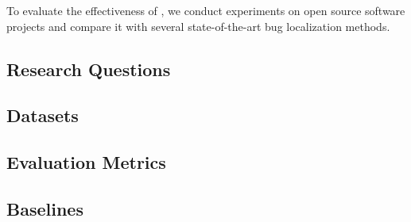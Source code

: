 To evaluate the effectiveness of \TRANPCNN, we conduct experiments on open source software projects and compare it with several state-of-the-art bug localization methods.

\subsection{Research Questions}


\subsection{Datasets}


\subsection{Evaluation Metrics}


\subsection{Baselines}

